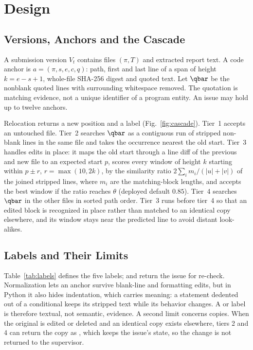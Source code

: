 \section{Design}\label{sec:design}



\subsection{Versions, Anchors and the Cascade}
A submission version $V_t$ contains files $(\pi,T)$ and extracted report text. A code anchor is $a=(\pi,s,e,c,q)$: path, first and last line of a span of height $k=e-s+1$, whole-file SHA-256 digest and quoted text. Let $\qbar$ be the nonblank quoted lines with surrounding whitespace removed. The quotation is matching evidence, not a unique identifier of a program entity. An issue may hold up to twelve anchors.

Relocation returns a new position and a label (Fig.~\ref{fig:cascade}). Tier~1 accepts an untouched file. Tier~2 searches $\qbar$ as a contiguous run of stripped non-blank lines in the same file and takes the occurrence nearest the old start. Tier~3 handles edits in place: it maps the old start through a line diff \cite{pythonsequence} of the previous and new file to an expected start $p$, scores every window of height $k$ starting within $p \pm r$, $r=\max(10,2k)$, by the similarity ratio $2\sum_i m_i/(|u|+|v|)$ of the joined stripped lines, where $m_i$ are the matching-block lengths, and accepts the best window if the ratio reaches $\theta$ (deployed default $0.85$). Tier~4 searches $\qbar$ in the other files in sorted path order. Tier~3 runs before tier~4 so that an edited block is recognized in place rather than matched to an identical copy elsewhere, and its window stays near the predicted line to avoid distant look-alikes.


\subsection{Labels and Their Limits}
Table~\ref{tab:labels} defines the five labels;  and  return the issue for re-check. Normalization lets an anchor survive blank-line and formatting edits, but in Python it also hides indentation, which carries meaning: a statement dedented out of a conditional keeps its stripped text while its behavior changes. A  or  label is therefore textual, not semantic, evidence. A second limit concerns copies. When the original is edited or deleted and an identical copy exists elsewhere, tiers 2 and 4 can return the copy as , which keeps the issue's state, so the change is not returned to the supervisor.

